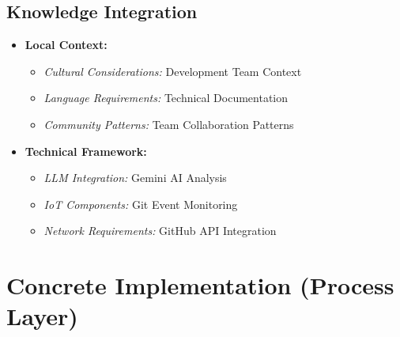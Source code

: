 \documentclass{article}
\begin{document}
\subsection{Knowledge Integration}
\begin{itemize}
    \item \textbf{Local Context:}
    \begin{itemize}
        \item \textit{Cultural Considerations:} Development Team Context
        \item \textit{Language Requirements:} Technical Documentation
        \item \textit{Community Patterns:} Team Collaboration Patterns
    \end{itemize}
    \item \textbf{Technical Framework:}
    \begin{itemize}
        \item \textit{LLM Integration:} Gemini AI Analysis
        \item \textit{IoT Components:} Git Event Monitoring
        \item \textit{Network Requirements:} GitHub API Integration
    \end{itemize}
\end{itemize}
\section{Concrete Implementation (Process Layer)}
\end{document}
